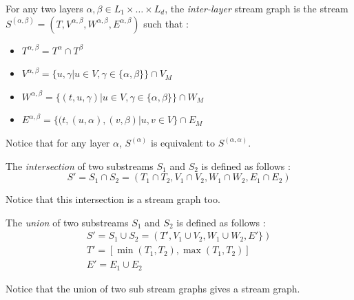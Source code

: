 \documentclass[dvipsnames,a4paper,11pt]{article}
\theoremstyle{definition}
\theoremstyle{remark}
\theoremstyle{remark}
\begin{document}
	For any two layers $\alpha, \beta \in L_1\times \dots\times L_d$, the {\em inter-layer} stream graph is the stream $S^{(\alpha,\beta)} = (T, V^{\alpha,\beta},W^{\alpha,\beta},E^{\alpha,\beta})$ such that :
	\begin{itemize}
		\item $T^{\alpha,\beta}=T^{\alpha}\cap T^{\beta}$
		\item $V^{\alpha,\beta} = \{u,\gamma | u \in V, \gamma \in \{\alpha,\beta\} \} \cap V_M$
		\item $W^{\alpha,\beta}= \{(t,u,\gamma) | u \in V, \gamma \in \{\alpha,\beta\} \} \cap W_M$
	    \item $E^{\alpha,\beta} = \{(t,(u,\alpha),(v,\beta) | u,v \in V\} \cap E_M $
	\end{itemize}

	    Notice that for any layer $\alpha$, $S^{(\alpha)}$ is equivalent to $S^{(\alpha,\alpha)}$.



	The {\em intersection} of two substreams $S_1$ and $S_2$ is defined as follows :
	\[
		S' = S_1 \cap S_2 = (T_1\cap T_2, V_1 \cap V_2, W_1 \cap W_2, E_1\cap E_2)
	\]

	Notice that this intersection is a stream graph too.

	The {\em union} of two substreams $S_1$ and $S_2$ is defined as follows :
	\begin{align*}
		S' = S_1 \cup S_2 = (T', V_1 \cup V_2, W_1 \cup W_2, E' \})\\
		T' = [\min(T_1,T_2),\max(T_1,T_2)]\\
		E' = E_1 \cup E_2 
	\end{align*}

	Notice that the union of two sub stream graphs gives a stream graph.
\end{document}
